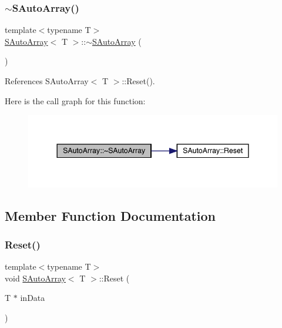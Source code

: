 \subsubsection{\texorpdfstring{$\sim$SAutoArray()}{~SAutoArray()}}
{\footnotesize\ttfamily template$<$typename T$>$ \\
\mbox{\hyperlink{a01949}{S\+Auto\+Array}}$<$ T $>$\+::$\sim$\mbox{\hyperlink{a01949}{S\+Auto\+Array}} (\begin{DoxyParamCaption}{ }\end{DoxyParamCaption})\hspace{0.3cm}{\ttfamily [inline]}}



References S\+Auto\+Array$<$ T $>$\+::\+Reset().

Here is the call graph for this function\+:
\nopagebreak
\begin{figure}[H]
\begin{center}
\leavevmode
\includegraphics[width=344pt]{a01949_a44307013a0fe368d551b2407171896ed_cgraph}
\end{center}
\end{figure}


\subsection{Member Function Documentation}
\mbox{\label{a01949_a03fecb1c751d3f68d8f44f34126e363c}} 
\subsubsection{\texorpdfstring{Reset()}{Reset()}}
{\footnotesize\ttfamily template$<$typename T$>$ \\
void \mbox{\hyperlink{a01949}{S\+Auto\+Array}}$<$ T $>$\+::Reset (\begin{DoxyParamCaption}\item[{T $\ast$}]{in\+Data }\end{DoxyParamCaption})\hspace{0.3cm}{\ttfamily [inline]}}



